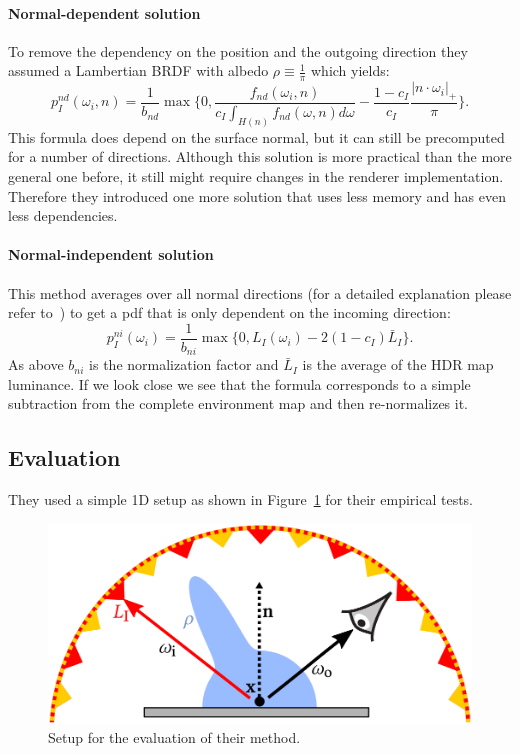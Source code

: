 \paragraph{Normal-dependent solution}
\label{par:ibl_normal_dependent}
To remove the dependency on the position and the outgoing direction they assumed a Lambertian BRDF with albedo $ \rho \equiv \frac{1}{\pi} $
which yields:
\begin{equation}
    \label{eq:normal_dependent}
    p_I^{nd}(\omega_i, n) = \frac{1}{b_{nd}} \max\{0, \frac{f_{nd}(\omega_i, n)}{c_I \int_{H(n)} f_{nd}(\omega, n) d\omega} - \frac{1 - c_I}{c_I} \frac{|n \cdot \omega_i|_+}{\pi}\}.
\end{equation}
This formula does depend on the surface normal,
but it can still be precomputed for a number of directions.
Although this solution is more practical than the more general one before,
it still might require changes in the renderer implementation.
Therefore they introduced one more solution that uses less memory and has even less dependencies.


\paragraph{Normal-independent solution}
\label{par:ibl_normal_independent}
This method averages over all normal directions (for a detailed explanation please refer to~\cite[Appendix~D]{Karlik2019})
to get a pdf that is only dependent on the incoming direction: $$ p_I^{ni}(\omega_i) = \frac{1}{b_{ni}} \max\{0, L_I(\omega_i) - 2 (1 - c_I) \bar{L}_I\}. $$
As above $ b_{ni} $ is the normalization factor and $ \bar{L}_I $ is the average of the HDR map luminance.
If we look close we see that the formula corresponds to a simple subtraction from the complete environment map and then re-normalizes it.


\subsection{Evaluation}
\label{sec:ibl_evalution}
They used a simple 1D setup as shown in Figure~\ref{fig:ibl_setup} for their empirical tests.

\begin{figure}[h]
    \centering
    \includegraphics[width=.4\textwidth]{images/ibl_setup.png}
    \caption{Setup for the evaluation of their method.
    \cite[Figure~3]{Karlik2019}}
    \label{fig:ibl_setup}
\end{figure}

